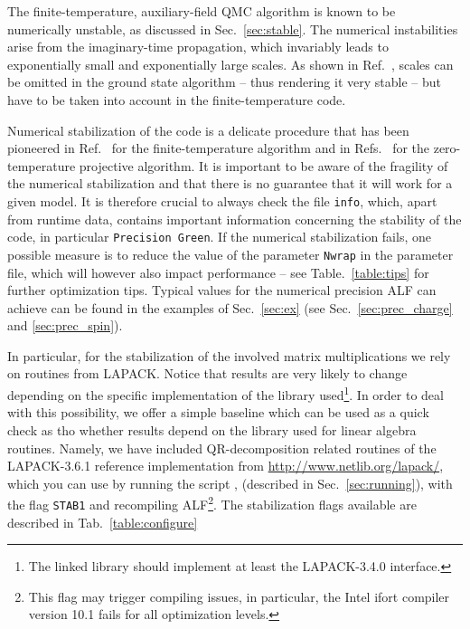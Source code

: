 The finite-temperature, auxiliary-field QMC algorithm is known to be numerically unstable, as discussed in Sec.~\ref{sec:stable}.
The numerical instabilities arise from the imaginary-time propagation, which invariably leads to exponentially small and exponentially large scales.
As shown in Ref.~\cite{Assaad08_rev}, scales can be omitted in the ground state algorithm -- thus rendering it very stable --  but have to be taken into account in the  finite-temperature code.

Numerical stabilization of the code is a delicate procedure that has been pioneered in Ref.~\cite{White89}  for the finite-temperature algorithm and in Refs.~\cite{Sugiyama86,Sorella89} for the zero-temperature projective algorithm.
It is important to be aware of the fragility of the numerical stabilization and that there is no guarantee that it will work for a given model. It is therefore crucial to always check the file \texttt{info}, which, apart from runtime data, contains important information concerning the stability of the code, in particular \texttt{Precision Green}.
If the numerical stabilization fails, one possible measure is to reduce the value of the parameter \texttt{Nwrap} in the parameter file, which will however also impact performance -- see Table.~\ref{table:tips} for further optimization tips. Typical values for the numerical precision ALF can achieve can be found in the examples of Sec.~\ref{sec:ex} (see Sec.~\ref{sec:prec_charge} and \ref{sec:prec_spin}).

In particular, for the stabilization of the involved matrix multiplications we rely on routines from LAPACK. Notice that results are very likely to change
depending on the specific implementation of the library used\footnote{The linked library should implement at least the LAPACK-3.4.0 interface.}.
In order to deal with this possibility, we offer a simple baseline which can be used as a quick check as tho whether results depend on the library used for linear algebra routines. Namely, we have included QR-decomposition related routines of the LAPACK-3.6.1 reference implementation from \url{http://www.netlib.org/lapack/}, which you can use by 
running the script , (described in Sec.~\ref{sec:running}), with the flag \texttt{STAB1} and recompiling ALF\footnote{This flag may trigger compiling issues, in particular, the Intel ifort compiler version 10.1 fails for all optimization levels.}. The stabilization flags available are described in Tab.~\ref{table:configure}

